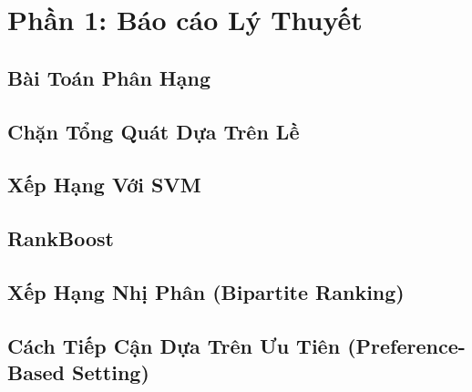 


\section{Phần 1: Báo cáo Lý Thuyết}


\subsection{Bài Toán Phân Hạng}
\vspace{0.5cm}

\subsection{Chặn Tổng Quát Dựa Trên Lề}
\vspace{0.5cm}

\subsection{Xếp Hạng Với SVM}
\vspace{0.5cm}

\subsection{RankBoost}
\vspace{0.5cm}

\subsection{Xếp Hạng Nhị Phân (Bipartite Ranking)}
\vspace{0.5cm}

\subsection{Cách Tiếp Cận Dựa Trên Ưu Tiên (Preference-Based Setting)}


